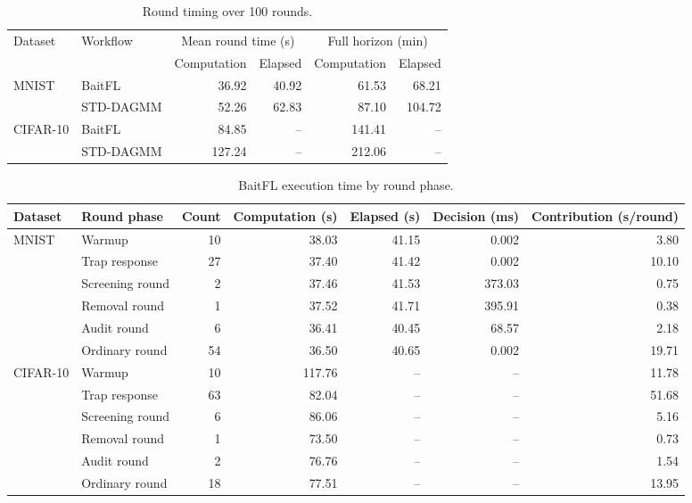 
\begin{table}[t]\centering\footnotesize
\caption{Round timing over 100 rounds.}\label{tab:timing-horizons}
\begin{tabular}{llrrrr}\toprule
\multirow{2}{*}{Dataset} & \multirow{2}{*}{Workflow} & \multicolumn{2}{c}{Mean round time (s)} & \multicolumn{2}{c}{Full horizon (min)} \\
\cmidrule(lr){3-4}\cmidrule(lr){5-6}
 & & Computation & Elapsed & Computation & Elapsed \\ \midrule
\multirow{2}{*}{MNIST} & BaitFL & 36.92 & 40.92 & 61.53 & 68.21 \\
 & STD-DAGMM & 52.26 & 62.83 & 87.10 & 104.72 \\
\midrule
\multirow{2}{*}{CIFAR-10} & BaitFL & 84.85 & -- & 141.41 & -- \\
 & STD-DAGMM & 127.24 & -- & 212.06 & -- \\
\bottomrule\end{tabular}\end{table}
\begin{table}[t]\centering\footnotesize
\caption{BaitFL execution time by round phase.}\label{tab:timing-phases}
\begin{tabular}{llrrrrr}\toprule Dataset & Round phase & Count & Computation (s) & Elapsed (s) & Decision (ms) & Contribution (s/round) \\ \midrule
\multirow{6}{*}{MNIST} & Warmup & 10 & 38.03 & 41.15 & 0.002 & 3.80 \\
 & Trap response & 27 & 37.40 & 41.42 & 0.002 & 10.10 \\
 & Screening round & 2 & 37.46 & 41.53 & 373.03 & 0.75 \\
 & Removal round & 1 & 37.52 & 41.71 & 395.91 & 0.38 \\
 & Audit round & 6 & 36.41 & 40.45 & 68.57 & 2.18 \\
 & Ordinary round & 54 & 36.50 & 40.65 & 0.002 & 19.71 \\
\midrule
\multirow{6}{*}{CIFAR-10} & Warmup & 10 & 117.76 & -- & -- & 11.78 \\
 & Trap response & 63 & 82.04 & -- & -- & 51.68 \\
 & Screening round & 6 & 86.06 & -- & -- & 5.16 \\
 & Removal round & 1 & 73.50 & -- & -- & 0.73 \\
 & Audit round & 2 & 76.76 & -- & -- & 1.54 \\
 & Ordinary round & 18 & 77.51 & -- & -- & 13.95 \\
\bottomrule\end{tabular}\end{table}
